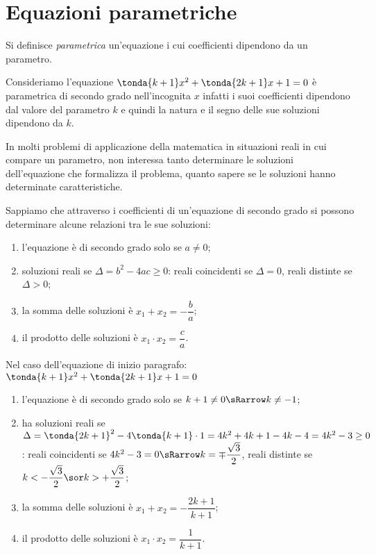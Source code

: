 \section{Equazioni parametriche}
\label{sec:eq2gr_parametriche}

\begin{definizione}
Si definisce \emph{parametrica} un'equazione i cui coefficienti dipendono da un 
parametro.
\end{definizione}
Consideriamo l'equazione \(\tonda{k +1}x^2 +\tonda{2k +1}x +1 = 0\) è 
parametrica di secondo grado nell'incognita \(x\) infatti i suoi coefficienti 
dipendono dal valore del parametro \(k\) e quindi la natura e il segno delle 
sue soluzioni dipendono da \(k\).

In molti problemi di applicazione della matematica in situazioni reali in cui 
compare un parametro, non interessa tanto determinare le soluzioni 
dell'equazione che formalizza il problema, quanto sapere se le soluzioni hanno 
determinate caratteristiche.

Sappiamo che attraverso i coefficienti di un'equazione di secondo grado si 
possono determinare alcune relazioni tra le sue soluzioni:
\begin{enumerate} [noitemsep]
\item l'equazione è di secondo grado solo se \(a \neq 0\);
\item soluzioni reali se \(\Delta = b^{2} -4 a c \geq 0\):
 \subitem reali coincidenti se \(\Delta = 0\), 
 \subitem reali distinte se \(\Delta > 0\);
\item la somma delle soluzioni è \(x_1 +x_2 = -\dfrac{b}{a}\);
\item il prodotto delle soluzioni è \(x_1 \cdot x_2 = \dfrac{c}{a}\).
\end{enumerate}
Nel caso dell'equazione di inizio paragrafo: \quad
\(\tonda{k +1}x^2 +\tonda{2k +1}x +1 = 0\)
\begin{enumerate} [noitemsep]
\item l'equazione è di secondo grado solo se 
\(k +1 \neq 0 \sRarrow k \neq -1\);
\item ha soluzioni reali se 
\(\Delta = \tonda{2k +1}^{2} -4 \tonda{k +1} \cdot 1 = 
           4k^2 +4k +1 -4k -4 = 4k^2 -3 \geq 0\):
 \subitem reali coincidenti se 
 \(4k^2-3 = 0 \sRarrow k = \mp \dfrac{\sqrt{3}}{2}\), 
 \subitem reali distinte se 
 \(k < -\dfrac{\sqrt{3}}{2} \sor k > +\dfrac{\sqrt{3}}{2}\);
\item la somma delle soluzioni è 
\(x_1 +x_2 = -\dfrac{2k +1}{k+1}\);
\item il prodotto delle soluzioni è 
\(x_1 \cdot x_2 = \dfrac{1}{k+1}\).
\end{enumerate}

